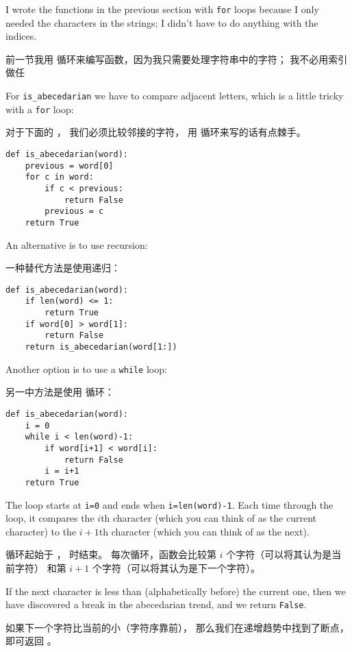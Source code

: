 I wrote the functions in the previous section with {\tt for}
loops because I only needed the characters in the strings; I didn't
have to do anything with the indices.

前一节我用  循环来编写函数，因为我只需要处理字符串中的字符；
我不必用索引做任

For \verb"is_abecedarian" we have to compare adjacent letters,
which is a little tricky with a {\tt for} loop:

对于下面的  ， 我们必须比较邻接的字符， 用  循环来写的话有点棘手。

\begin{lstlisting}
def is_abecedarian(word):
    previous = word[0]
    for c in word:
        if c < previous:
            return False
        previous = c
    return True
\end{lstlisting}

An alternative is to use recursion:

一种替代方法是使用递归：

\begin{lstlisting}
def is_abecedarian(word):
    if len(word) <= 1:
        return True
    if word[0] > word[1]:
        return False
    return is_abecedarian(word[1:])
\end{lstlisting}

Another option is to use a {\tt while} loop:

另一中方法是使用  循环：

\begin{lstlisting}
def is_abecedarian(word):
    i = 0
    while i < len(word)-1:
        if word[i+1] < word[i]:
            return False
        i = i+1
    return True
\end{lstlisting}

%
The loop starts at {\tt i=0} and ends when {\tt i=len(word)-1}.  Each
time through the loop, it compares the $i$th character (which you can
think of as the current character) to the $i+1$th character (which you
can think of as the next).

循环起始于  ，  时结束。
每次循环，函数会比较第 $i$ 个字符（可以将其认为是当前字符）
和第 $i+1$ 个字符（可以将其认为是下一个字符）。

If the next character is less than (alphabetically before) the current
one, then we have discovered a break in the abecedarian trend, and
we return {\tt False}.

如果下一个字符比当前的小（字符序靠前），
那么我们在递增趋势中找到了断点，即可返回  。


